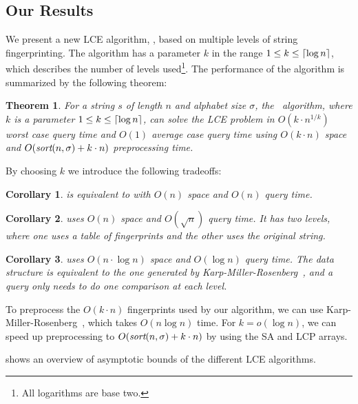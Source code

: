 \documentclass[a4]{article}
\newcommand*{\pref}{\prettyref}
\newtheorem{theorem}{Theorem}
\newtheorem{corollary}{Corollary}
\begin{document}
\subsection{Our Results}

We present a new LCE algorithm, \fprintk, based on multiple levels of string fingerprinting. The algorithm has a parameter $k$ in the range $1\leq k\leq\lceil\log n\rceil$, which describes the number of levels used\footnote{All logarithms are base two.}. The performance of the algorithm is summarized by the following theorem:

\begin{theorem}
For a string $s$ of length $n$ and alphabet size $\sigma$, the \fprintk\ algorithm, where $k$ is a parameter $1 \leq k \leq \lceil\log n\rceil$, can solve the LCE problem in $O(k\cdot n^{1/k})$ worst case query time and $O(1)$ average case query time using $O(k\cdot n)$ space and $O(\textit{sort}(n,\sigma) + k\cdot n)$ preprocessing time.
\end{theorem}

By choosing $k$ we introduce the following tradeoffs:

\begin{corollary}
\fprint[1] is equivalent to  with $O(n)$ space and $O(n)$ query time.
\end{corollary}

\begin{corollary}
\fprint[2] uses $O(n)$ space and $O(\sqrt n)$ query time. It has two levels, where one uses a table of fingerprints and the other uses the original string.
\end{corollary}

\begin{corollary}
\fprint[\logceil] uses $O(n\cdot\log n)$ space and $O(\log n)$ query time. The data structure is equivalent to the one generated by Karp-Miller-Rosenberg~\cite{karp-miller-rosenberg}, and a query only needs to do one comparison at each level.
\end{corollary}

To preprocess the $O(k\cdot n)$ fingerprints used by our algorithm, we can use Karp-Miller-Rosenberg~\cite{karp-miller-rosenberg}, which takes $O(n\log n)$ time. For $k=o(\log n)$, we can speed up preprocessing to $O(\textit{sort}(n,\sigma) + k\cdot n)$ by using the SA and LCP arrays.

\pref{tab:article-algorithms} shows an overview of asymptotic bounds of the different LCE algorithms.
\end{document}
